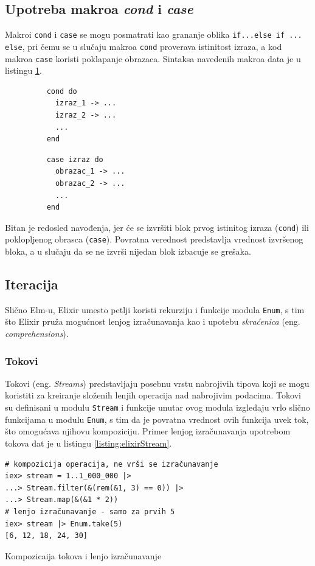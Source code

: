 \documentclass[12pt,oneside]{memoir}
\begin{document}
\subsection{Upotreba makroa \emph{cond} i \emph{case}}
Makroi \texttt{cond} i \texttt{case} se mogu posmatrati kao grananje oblika \texttt{if...else
if ... else}, pri čemu se u slučaju makroa \texttt{cond} proverava istinitost izraza, a kod
makroa \texttt{case} koristi poklapanje obrazaca. Sintaksa navedenih makroa data je u
listingu \ref{listing:elixirCond}.
\begin{figure}[!h]
\begin{minipage}{0.5\textwidth}
  \centering
  \begin{verbatim}
    cond do
      izraz_1 -> ...
      izraz_2 -> ...
      ...
    end
  \end{verbatim}
\end{minipage}
\begin{minipage}{0.5\textwidth}
  \centering
  \begin{verbatim}
    case izraz do
      obrazac_1 -> ...
      obrazac_2 -> ...
      ...
    end
  \end{verbatim}
\end{minipage}
\label{listing:elixirCond}
\end{figure}

Bitan je redosled navođenja, jer će se izvršiti blok prvog istinitog izraza (\texttt{cond}) ili
poklopljenog obrasca (\texttt{case}). Povratna verednost predstavlja vrednost izvršenog bloka, a
u slučaju da se ne izvrši nijedan blok izbacuje se grešaka. 

\subsection{Iteracija}
Slično Elm-u, Elixir umesto petlji koristi rekurziju i funkcije modula \texttt{Enum}, s tim
što Elixir pruža mogućnost lenjog izračunavanja kao i upotebu \emph{skraćenica}
(eng. \emph{comprehensions}).

\subsubsection{Tokovi}
Tokovi (eng. \emph{Streams}) predstavljaju posebnu vrstu nabrojivih tipova koji se mogu koristiti za kreiranje
složenih lenjih operacija nad nabrojivim podacima. Tokovi su definisani u modulu
\texttt{Stream} i funkcije unutar ovog modula izgledaju vrlo slično funkcijama u modulu
\texttt{Enum}, s tim da je povratna vrednost ovih funkcija uvek tok, što omogućava
njihovu kompoziciju. Primer lenjog izračunavanja upotrebom tokova dat je u listingu
\ref{listing:elixirStream}. 
\begin{listing}[!ht]
\begin{verbatim}
# kompozicija operacija, ne vrši se izračunavanje
iex> stream = 1..1_000_000 |> 
...> Stream.filter(&(rem(&1, 3) == 0)) |> 
...> Stream.map(&(&1 * 2))
# lenjo izračunavanje - samo za prvih 5
iex> stream |> Enum.take(5) 
[6, 12, 18, 24, 30]
\end{verbatim}
\caption{Kompozicaija tokova i lenjo izračunavanje}
\label{listing:elixirStream}
\end{listing}
\end{document}
